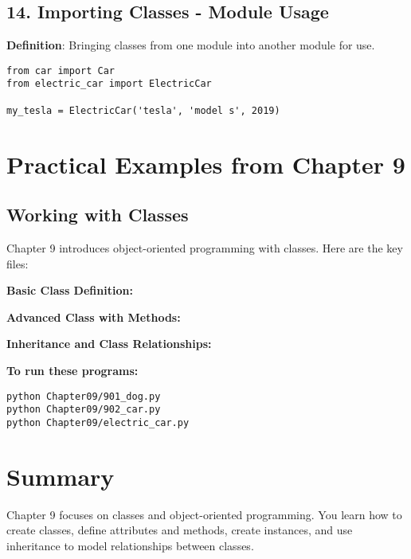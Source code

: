 \subsection*{14. Importing Classes - Module Usage}
\textbf{Definition}: Bringing classes from one module into another module for use.

\begin{lstlisting}
from car import Car
from electric_car import ElectricCar

my_tesla = ElectricCar('tesla', 'model s', 2019)
\end{lstlisting}

\section*{Practical Examples from Chapter 9}

\subsection*{Working with Classes}
Chapter 9 introduces object-oriented programming with classes. Here are the key files:

\textbf{Basic Class Definition:}


\textbf{Advanced Class with Methods:}


\textbf{Inheritance and Class Relationships:}


\textbf{To run these programs:}
\begin{verbatim}
python Chapter09/901_dog.py
python Chapter09/902_car.py
python Chapter09/electric_car.py
\end{verbatim}

\section*{Summary}
Chapter 9 focuses on classes and object-oriented programming. You learn how to create classes, define attributes and methods, create instances, and use inheritance to model relationships between classes.


